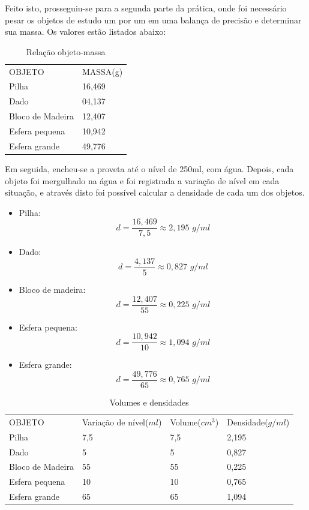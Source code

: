 \documentclass[12pt]{article}
\begin{document}
    Feito isto, prosseguiu-se para a segunda parte da prática, onde foi necessário pesar os objetos de estudo um por um em uma balança de precisão e determinar sua massa. Os valores estão listados abaixo: 
  
\begin{table}[]
\centering
\caption{Relação objeto-massa}
\label{my-label}
\begin{tabular}{ll}
OBJETO           & MASSA(g) \\[0.01cm]
Pilha            & 16,469   \\
Dado             & 04,137   \\
Bloco de Madeira & 12,407   \\
Esfera pequena   & 10,942   \\
Esfera grande    & 49,776  
\end{tabular}
\end{table}

Em seguida, encheu-se a proveta  até o nível de 250ml, com água. Depois, cada objeto foi mergulhado na água e foi registrada a variação de nível em cada situação, e através disto foi possível calcular a densidade de cada um dos objetos. 

\begin{itemize}
\item Pilha: $$d = \frac{16,469}{7,5} \approx 2,195  \textit{ g/ml}$$
\item Dado: $$d = \frac{4,137}{5} \approx 0,827  \textit{ g/ml}$$
\item Bloco de madeira:$$ d = \frac{12,407}{55} \approx 0,225  \textit{ g/ml}$$
\item Esfera pequena: $$d = \frac{10,942}{10} \approx 1,094  \textit{ g/ml}$$
\item Esfera grande: $$d = \frac{49,776}{65} \approx 0,765 \textit{ g/ml}$$

\end{itemize}
\begin{table}[]
\centering
\caption{Volumes e densidades}
\label{my-label}
\begin{tabular}{llll}
OBJETO           & Variação de nível($ml$) & Volume($cm^3$) & Densidade($g/ml$) \\
Pilha            & 7,5                   & 7,5                          & 2,195           \\
Dado             & 5                     & 5                            & 0,827           \\
Bloco de Madeira & 55                    & 55                           & 0,225           \\
Esfera pequena   & 10                    & 10                           & 0,765           \\
Esfera grande    & 65                    & 65                           & 1,094          
\end{tabular}
\end{table}
\end{document}

